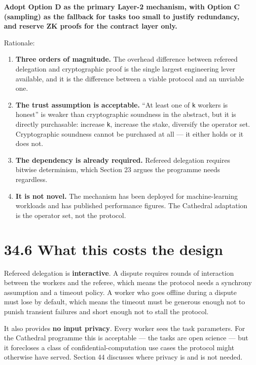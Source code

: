 \documentclass[
  11pt]{report}
\providecommand{\tightlist}{%
  \setlength{\itemsep}{0pt}\setlength{\parskip}{0pt}}
\begin{document}
\textbf{Adopt Option D as the primary Layer-2 mechanism, with Option C
(sampling) as the fallback for tasks too small to justify redundancy,
and reserve ZK proofs for the contract layer only.}

Rationale:

\begin{enumerate}
\def\labelenumi{\arabic{enumi}.}
\tightlist
\item
  \textbf{Three orders of magnitude.} The overhead difference between
  refereed delegation and cryptographic proof is the single largest
  engineering lever available, and it is the difference between a viable
  protocol and an unviable one.
\item
  \textbf{The trust assumption is acceptable.} ``At least one of
  \texttt{k} workers is honest'' is weaker than cryptographic soundness
  in the abstract, but it is directly purchasable: increase \texttt{k},
  increase the stake, diversify the operator set. Cryptographic
  soundness cannot be purchased at all --- it either holds or it does
  not.
\item
  \textbf{The dependency is already required.} Refereed delegation
  requires bitwise determinism, which Section 23 argues the programme
  needs regardless.
\item
  \textbf{It is not novel.} The mechanism has been deployed for
  machine-learning workloads and has published performance figures. The
  Cathedral adaptation is the operator set, not the protocol.
\end{enumerate}

\hypertarget{what-this-costs-the-design}{%
\section{34.6 What this costs the
design}\label{what-this-costs-the-design}}

Refereed delegation is \textbf{interactive}. A dispute requires rounds
of interaction between the workers and the referee, which means the
protocol needs a synchrony assumption and a timeout policy. A worker who
goes offline during a dispute must lose by default, which means the
timeout must be generous enough not to punish transient failures and
short enough not to stall the protocol.

It also provides \textbf{no input privacy}. Every worker sees the task
parameters. For the Cathedral programme this is acceptable --- the tasks
are open science --- but it forecloses a class of
confidential-computation use cases the protocol might otherwise have
served. Section 44 discusses where privacy is and is not needed.
\end{document}
